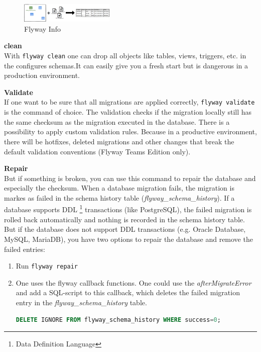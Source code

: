\begin{figure}[H]
	\centering
	\includegraphics[width=0.4\textwidth]{./chapters/intro_flyway/images/command-info}
	\caption[Flyway Info - Source: \cite{FlywayGetStarted}]{Flyway Info}
	\label{fig:command-info}
\end{figure}


\textbf{clean}\\
With \texttt{flyway clean} one can drop all objects like tables, views, triggers, etc. in the configures schemas.It can easily give you a fresh start but is dangerous in a production environment.

\textbf{Validate}\\
If one want to be sure that all migrations are applied correctly,  \texttt{flyway validate} is the command of choice. The validation checks if the migration locally still has the same checksum as the migration executed in the database.
There is a possibility to apply custom validation rules. Because in a productive environment, there will be hotfixes, deleted migrations and other changes that break the default validation conventions (Flyway Teams Edition only).

\textbf{Repair}\\
But if something is broken, you can use this command to repair the database and especially the checksum. When a database migration fails, the migration is markes as failed in the schema history table (\textit{flyway\_schema\_history}). If a database supports DDL \footnote{Data Definition Language} transactions (like PostgreSQL), the failed migration is rolled back automatically and nothing is recorded in the schema history table.  But if the database does not support DDL transactions (e.g. Oracle Database, MySQL, MariaDB), you have two options to repair the database and remove the failed entries:

\begin{enumerate}
	\item Run \texttt{flyway repair}\\
	\item One uses the flyway callback functions. One could use the \textit{afterMigrateError} and add a SQL-script to this callback, which deletes the failed migration entry in the \textit{flyway\_schema\_history} table.
	
	\begin{lstlisting}[language=SQL]
		DELETE IGNORE FROM flyway_schema_history WHERE success=0;
	\end{lstlisting}
\end{enumerate}


